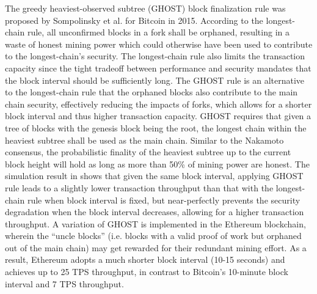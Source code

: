 The greedy heaviest-observed subtree (GHOST) {\color{\rcolor}block finalization rule} was proposed by Sompolinsky et al.  for Bitcoin in 2015. According to the longest-chain rule, all unconfirmed blocks in a fork shall be orphaned, resulting in a waste of honest mining power which could otherwise have been used to contribute to the longest-chain's security. The longest-chain rule also limits the transaction capacity {\color{\rcolor}since the tight tradeoff between performance and security mandates that the block interval should be sufficiently long}. The GHOST rule is an alternative to the longest-chain rule that the orphaned blocks also contribute to the main chain security, effectively reducing the impacts of forks, which allows for a shorter block interval and thus higher transaction capacity. GHOST requires that given a tree of blocks with the genesis block being the root, the longest chain within the heaviest subtree shall be used as the main chain. Similar to the Nakamoto consensus, the probabilistic finality of the heaviest subtree up to the current block height will hold as long as more than 50\% of mining power are honest. 
The simulation result in  shows that given the same block interval, applying GHOST rule leads to a slightly lower transaction throughput than that with the longest-chain rule when block interval is fixed, but near-perfectly prevents the security degradation when the block interval decreases, allowing for a higher transaction throughput.
A variation of GHOST is implemented in the Ethereum blockchain, wherein the ``uncle blocks'' (i.e. blocks with a valid proof of work but orphaned out of the main chain) may get rewarded for their redundant mining effort. As a result, Ethereum adopts a much shorter block interval (10-15 seconds) and achieves up to 25 TPS throughput, in contrast to Bitcoin's 10-minute block interval and 7 TPS throughput.

